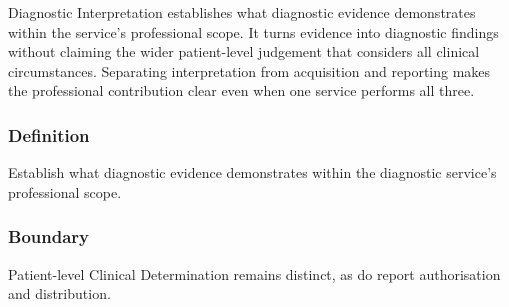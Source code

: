 Diagnostic Interpretation establishes what diagnostic evidence demonstrates within the service's professional scope. It turns evidence into diagnostic findings without claiming the wider patient-level judgement that considers all clinical circumstances. Separating interpretation from acquisition and reporting makes the professional contribution clear even when one service performs all three.

\subsubsection*{Definition}

Establish what diagnostic evidence demonstrates within the diagnostic service’s professional scope.

\subsubsection*{Boundary}

Patient-level Clinical Determination remains distinct, as do report authorisation and distribution.

